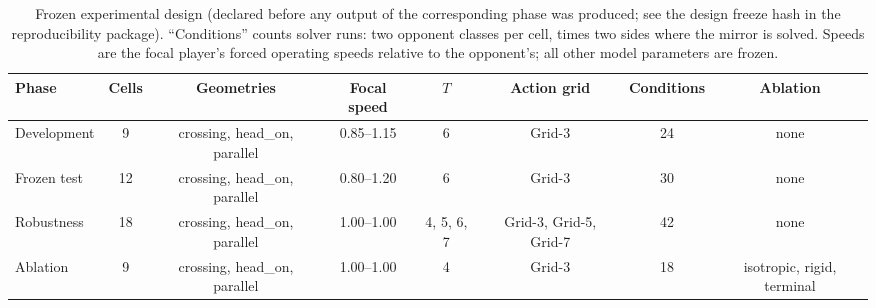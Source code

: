 \begin{table}[!htb]
\centering\small
\caption{Frozen experimental design (declared before any output of the
corresponding phase was produced; see the design freeze hash in the
reproducibility package).  ``Conditions'' counts solver runs: two opponent
classes per cell, times two sides where the mirror is solved.  Speeds are the
focal player's forced operating speeds relative to the opponent's; all other
model parameters are frozen.}
\label{tab:design}
\begin{tabular}{lccccccc}
\toprule
Phase & Cells & Geometries & Focal speed & $T$ & Action grid & Conditions & Ablation \\
\midrule
Development & 9 & crossing, head_on, parallel & 0.85--1.15 & 6 & Grid-3 & 24 & none \\
Frozen test & 12 & crossing, head_on, parallel & 0.80--1.20 & 6 & Grid-3 & 30 & none \\
Robustness & 18 & crossing, head_on, parallel & 1.00--1.00 & 4, 5, 6, 7 & Grid-3, Grid-5, Grid-7 & 42 & none \\
Ablation & 9 & crossing, head_on, parallel & 1.00--1.00 & 4 & Grid-3 & 18 & isotropic, rigid, terminal \\
\bottomrule
\end{tabular}
\end{table}
